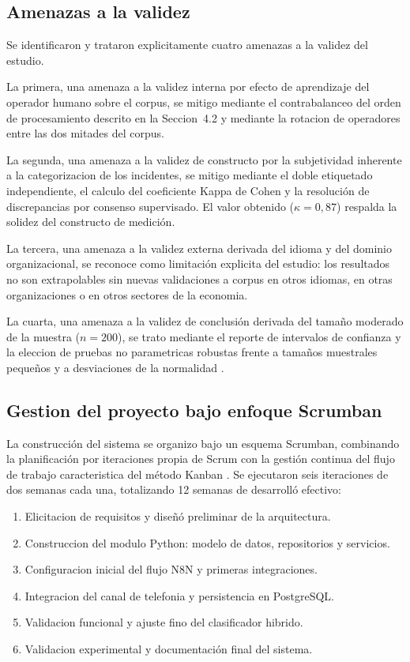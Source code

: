 \subsection{Amenazas a la validez}

Se identificaron y trataron explicitamente cuatro amenazas a la validez del estudio.

La primera, una amenaza a la validez interna por efecto de aprendizaje del operador humano sobre el corpus, se mitigo mediante el contrabalanceo del orden de procesamiento descrito en la Seccion~4.2 y mediante la rotacion de operadores entre las dos mitades del corpus.

La segunda, una amenaza a la validez de constructo por la subjetividad inherente a la categorizacion de los incidentes, se mitigo mediante el doble etiquetado independiente, el calculo del coeficiente Kappa de Cohen y la resolución de discrepancias por consenso supervisado. El valor obtenido (\(\kappa = 0{,}87\)) respalda la solidez del constructo de medición.

La tercera, una amenaza a la validez externa derivada del idioma y del dominio organizacional, se reconoce como limitación explicita del estudio: los resultados no son extrapolables sin nuevas validaciones a corpus en otros idiomas, en otras organizaciones o en otros sectores de la economia.

La cuarta, una amenaza a la validez de conclusión derivada del tamaño moderado de la muestra (\(n = 200\)), se trato mediante el reporte de intervalos de confianza y la eleccion de pruebas no parametricas robustas frente a tamaños muestrales pequeños y a desviaciones de la normalidad \parencite{HernandezSampieri2018_metodologia}.

\subsection{Gestion del proyecto bajo enfoque Scrumban}

La construcción del sistema se organizo bajo un esquema Scrumban, combinando la planificación por iteraciones propia de Scrum con la gestión continua del flujo de trabajo caracteristica del método Kanban \parencite{Ladas2009_scrumban}. Se ejecutaron seis iteraciones de dos semanas cada una, totalizando 12 semanas de desarrolló efectivo:

\begin{enumerate}[label=Iteracion \arabic*:, leftmargin=*]
  \item Elicitacion de requisitos y diseñó preliminar de la arquitectura.
  \item Construccion del modulo Python: modelo de datos, repositorios y servicios.
  \item Configuracion inicial del flujo N8N y primeras integraciones.
  \item Integracion del canal de telefonia y persistencia en PostgreSQL.
  \item Validacion funcional y ajuste fino del clasificador hibrido.
  \item Validacion experimental y documentación final del sistema.
\end{enumerate}


